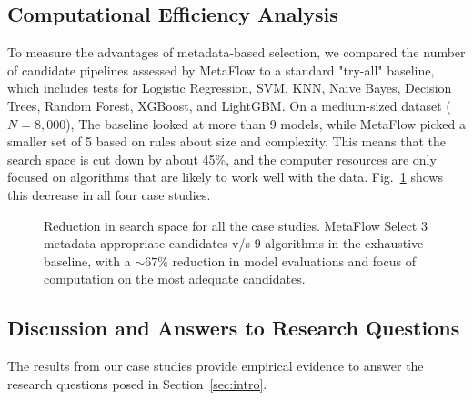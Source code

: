 \documentclass[conference]{llncs}
\begin{document}
   \subsection{Computational Efficiency Analysis} %
   To measure the advantages of metadata-based selection, we compared the number of candidate pipelines assessed by MetaFlow to a standard "try-all" baseline, which includes tests for Logistic Regression, SVM, KNN, Naive Bayes, Decision Trees, Random Forest, XGBoost, and LightGBM. 
   On a medium-sized dataset ($N=8{,}000$), The baseline looked at more than 9 models, while MetaFlow picked a smaller set of 5 based on rules about size and complexity.   This means that the search space is cut down by about 45\%, and the computer resources are only focused on algorithms that are likely to work well with the data.
   Fig.~\ref{fig:search_reduction} shows this decrease in all four case studies.

   \begin{figure}[ht]
   \centering
   \caption{Reduction in search space for all the case studies. MetaFlow Select 3 metadata appropriate candidates v/s 9
algorithms in the exhaustive baseline, with a $\sim67\%$
reduction in model evaluations and focus of computation on
the most adequate candidates.}
   \label{fig:search_reduction}
   \end{figure}

   \subsection{Discussion and Answers to Research Questions}
   The results from our case studies provide empirical evidence to answer the research questions posed in Section~\ref{sec:intro}.
\end{document}
